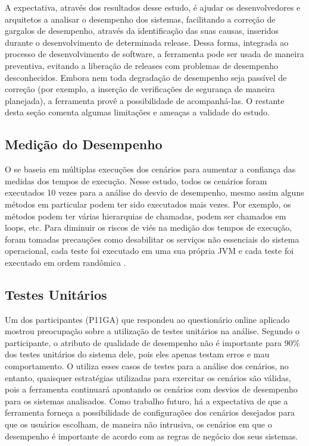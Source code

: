 A expectativa, através dos resultados desse estudo, é ajudar os desenvolvedores e arquitetos a analisar o desempenho dos sistemas, facilitando a correção de gargalos de desempenho, através da identificação das suas causas, inseridos durante o desenvolvimento de determinada release. Dessa forma, integrada ao processo de desenvolvimento de software, a ferramenta pode ser usada de maneira preventiva, evitando a liberação de releases com problemas de desempenho desconhecidos. Embora nem toda degradação de desempenho seja passível de correção (por exemplo, a inserção de verificações de segurança de maneira planejada), a ferramenta provê a possibilidade de acompanhá-las. O restante desta seção comenta algumas limitações e ameaças a validade do estudo.

\subsection{Medição do Desempenho}

O \textit{\perfMinerName} se baseia em múltiplas execuções dos cenários para aumentar a confiança das medidas dos tempos de execução. Nesse estudo, todos os cenários foram executados 10 vezes para a análise do desvio de desempenho, mesmo assim alguns métodos em particular podem ter sido executados mais vezes. Por exemplo, os métodos podem ter várias hierarquias de chamadas, podem ser chamados em loops, etc. Para diminuir os riscos de viés na medição dos tempos de execução, foram tomadas precauções como desabilitar os serviços não essenciais do sistema operacional, cada teste foi executado em uma sua própria JVM e cada teste foi executado em ordem randômica \cite{Pinto2015}.

\subsection{Testes Unitários} \label{subsec:avaliacao-consideracoes-testes-unitarios}

Um dos participantes (P11GA) que respondeu ao questionário online aplicado mostrou preocupação sobre a utilização de testes unitários na análise. Segundo o participante, o atributo de qualidade de desempenho não é importante para 90\% dos testes unitários do sistema dele, pois eles apenas testam erros e mau comportamento. O \textit{\perfMinerName} utiliza esses casos de testes para a análise dos cenários, no entanto, quaisquer estratégias utilizadas para exercitar os cenários são válidas, pois a ferramenta continuará apontando os cenários com desvios de desempenho para os sistemas analisados. Como trabalho futuro, há a expectativa de que a ferramenta forneça a possibilidade de configurações dos cenários desejados para que os usuários escolham, de maneira não intrusiva, os cenários em que o desempenho é importante de acordo com as regras de negócio dos seus sistemas.

